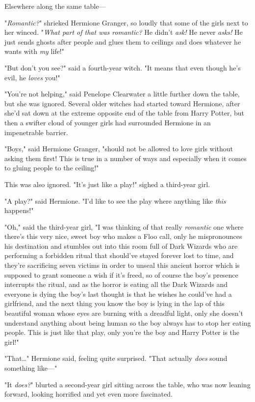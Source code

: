 Elsewhere along the same table---

"\emph{Romantic?}" shrieked Hermione Granger, so loudly that some of the girls
next to her winced. "\emph{What part of that was romantic?} He didn't
\emph{ask!} He never \emph{asks!} He just sends ghosts after people and glues
them to ceilings and does whatever he wants with \emph{my} life!"

"But don't you see?" said a fourth-year witch. "It means that even though he's
evil, he \emph{loves} you!"

"You're not helping," said Penelope Clearwater a little further down the table,
but she was ignored. Several older witches had started toward Hermione, after
she'd sat down at the extreme opposite end of the table from Harry Potter, but
then a swifter cloud of younger girls had surrounded Hermione in an
impenetrable barrier.

"Boys," said Hermione Granger, "should not be allowed to love girls without
asking them first! This is true in a number of ways and especially when it
comes to gluing people to the ceiling!"

This was also ignored. "It's just like a play!" sighed a third-year girl.

"A play?" said Hermione. "I'd like to see the play where anything like
\emph{this} happens!"

"Oh," said the third-year girl, "I was thinking of that really \emph{romantic}
one where there's this very nice, sweet boy who makes a Floo call, only he
mispronounces his destination and stumbles out into this room full of Dark
Wizards who are performing a forbidden ritual that should've stayed forever
lost to time, and they're sacrificing seven victims in order to unseal this
ancient horror which is supposed to grant someone a wish if it's freed, so of
course the boy's presence interrupts the ritual, and as the horror is eating
all the Dark Wizards and everyone is dying the boy's last thought is that he
wishes he could've had a girlfriend, and the next thing you know the boy is
lying in the lap of this beautiful woman whose eyes are burning with a dreadful
light, only she doesn't understand anything about being human so the boy always
has to stop her eating people. This is just like that play, only you're the boy
and Harry Potter is the girl!"

"That{\ldots}" Hermione said, feeling quite surprised. "That actually
\emph{does} sound something like---"

"It \emph{does?}" blurted a second-year girl sitting across the table, who was
now leaning forward, looking horrified and yet even more fascinated.

